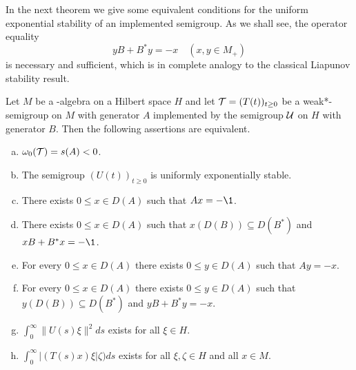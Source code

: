 In the next theorem we give some equivalent conditions for the uniform exponential stability of an implemented semigroup.
As we shall see, the operator equality
\[
yB + B^{*}y = -x \quad (x, y \in M_{+})
\]
is necessary and sufficient, which is in complete analogy to the classical Liapunov stability result.
\begin{theorem}\label{thm:d4-2.2}
Let $M$ be a \WA-algebra on a Hilbert space $H$ and let $\mathcal{T} = (T(t))_{t \geq 0}$ be a weak*-semigroup on $M$ with generator $A$ implemented by the semigroup $\mathcal{U}$ on $H$ with generator $B$.
Then the following assertions are equivalent.
\begin{enumerate}[(a)]

\item\label{item:d4-2.2-a}
$\omega_{0}(\mathcal{T}) = s(A) < 0$.

\item\label{item:d4-2.2-b}
The semigroup $(U(t))_{t \geq 0}$ is uniformly exponentially stable.

\item\label{item:d4-2.2-c}
There exists $0 \leq x \in D(A)$ such that $Ax = -\1$.

\item\label{item:d4-2.2-d}
There exists $0 \leq x \in D(A)$ such that $x(D(B)) \subseteq D(B^{*})$ \mbox{and $xB+B^{*}x = -\1$}.

\item\label{item:d4-2.2-e}
For every $0 \leq x \in D(A)$ there exists $0 \leq y \in D(A)$ such that $Ay = -x$.

\item\label{item:d4-2.2-f}
For every $0 \leq x \in D(A)$ there exists $0 \leq y \in D(A)$ such that $y(D(B)) \subseteq D(B^{*})$ and $yB+B^{*}y = -x$.

\item\label{item:d4-2.2-g}
$\int_{0}^{\infty} \|U(s)\xi\|^2ds$ exists for all $\xi \in H$.

\item\label{item:d4-2.2-h}
$\int_{0}^{\infty} |(T(s)x)\xi|\zeta)ds$ exists for all $\xi,\zeta \in H$ and all $x \in M$.
\end{enumerate}
\end{theorem}

